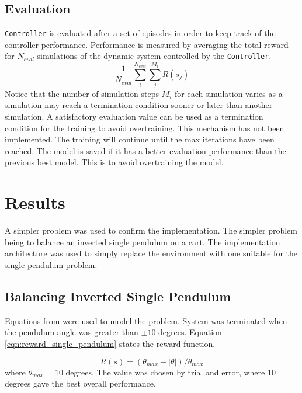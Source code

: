 \documentclass[final]{LTHtwocol} %
\begin{document}
\subsection{Evaluation}
\texttt{Controller} is evaluated after a set of episodes in order to keep track of the controller performance.
Performance is measured by averaging the total reward for $N_{eval}$ simulations of the dynamic system controlled by the \texttt{Controller}.
\begin{equation}
	\label{eqn:evaluation_equation}
	\frac{1}{N_{eval}} \sum_i^{N_{eval}} \sum_j^{M_i} R(s_j)
\end{equation}
Notice that the number of simulation steps $M_i$ for each simulation varies as a simulation may reach a termination condition sooner or later than another simulation.
A satisfactory evaluation value can be used as a termination condition for the training to avoid overtraining.
This mechanism has not been implemented.
The training will continue until the max iterations have been reached.
The model is saved if it has a better evaluation performance than the previous best model.
This is to avoid overtraining the model.

\section{Results}
A simpler problem was used to confirm the implementation.
The simpler problem being to balance an inverted single pendulum on a cart.
The implementation architecture was used to simply replace the environment with one suitable for the single pendulum problem.

\subsection{Balancing Inverted Single Pendulum}
Equations from \cite{Correct_Equations} were used to model the problem.
System was terminated when the pendulum angle was greater than $\pm 10$ degrees.
Equation \eqref{eqn:reward_single_pendulum} states the reward function.

\begin{equation}
    \label{eqn:reward_single_pendulum}
    R(s) = (\theta_{max} - |\theta|)/ \theta_{max}
\end{equation}
where $\theta_{max} = 10$ degrees.
The value was chosen by trial and error, where $10$ degrees gave the best overall performance.
\end{document}
